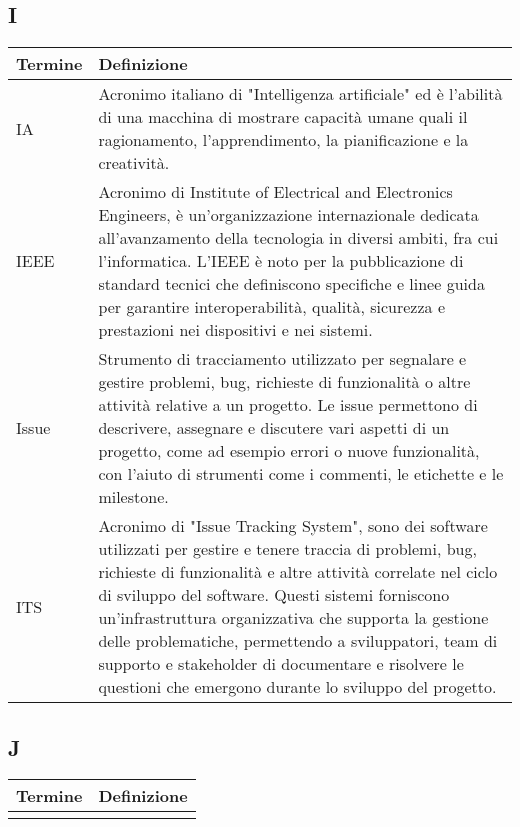 \documentclass[10pt]{article}
\begin{document}
\subsection{I} %
\begin{longtable}{|>{\centering\arraybackslash}m{2.5cm}|>{\arraybackslash}m{12.5cm}|}
\hline
\rowcolor[gray]{0.8}
\textbf{Termine} & \textbf{Definizione}\\
\endhead
\hline
IA & Acronimo italiano di "Intelligenza artificiale" ed è l'abilità di una macchina di mostrare capacità umane quali il ragionamento, l’apprendimento, la pianificazione e la creatività.\\
\hline
IEEE & Acronimo di Institute of Electrical and Electronics Engineers, è un'organizzazione internazionale dedicata all'avanzamento della tecnologia in diversi ambiti, fra cui l'informatica. L'IEEE è noto per la pubblicazione di standard tecnici che definiscono specifiche e linee guida per garantire interoperabilità, qualità, sicurezza e prestazioni nei dispositivi e nei sistemi.\\
\hline
Issue & Strumento di tracciamento utilizzato per segnalare e gestire problemi, bug, richieste di funzionalità o altre attività relative a un progetto. Le issue permettono di descrivere, assegnare e discutere vari aspetti di un progetto, come ad esempio errori o nuove funzionalità, con l'aiuto di strumenti come i commenti, le etichette e le milestone.\\
\hline
ITS & Acronimo di "Issue Tracking System", sono dei software utilizzati per gestire e tenere traccia di problemi, bug, richieste di funzionalità e altre attività correlate nel ciclo di sviluppo del software. Questi sistemi forniscono un'infrastruttura organizzativa che supporta la gestione delle problematiche, permettendo a sviluppatori, team di supporto e stakeholder di documentare e risolvere le questioni che emergono durante lo sviluppo del progetto.\\
\hline
\end{longtable}

\subsection{J} %
\begin{longtable}{|>{\centering\arraybackslash}m{2.5cm}|>{\arraybackslash}m{12.5cm}|}
\hline
\rowcolor[gray]{0.8}
\textbf{Termine} & \textbf{Definizione}\\
\endhead
\hline
 & \\
\hline
\end{longtable}
\end{document}
